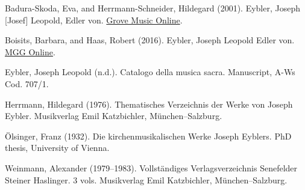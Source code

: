 \documentclass{ees}
\begin{document}
\begin{bulletlist}
  \item Badura-Skoda, Eva, and Herrmann-Schneider, Hildegard (2001). Eybler, Joseph [Josef] Leopold, Edler von. \href{https://doi.org/10.1093/gmo/9781561592630.article.40047}{Grove Music Online}.
  \item Boisits, Barbara, and Haas, Robert (2016). Eybler, Joseph Leopold Edler von. \href{https://www.mgg-online.com/mgg/stable/13179}{MGG Online}.
  \item Eybler, Joseph Leopold (n.d.). Catalogo della musica sacra. Manuscript, A-Ws Cod. 707/1.
  \item Herrmann, Hildegard (1976). Thematisches Verzeichnis der Werke von Joseph Eybler. Musikverlag Emil Katzbichler, München–Salzburg.
  \item Ölsinger, Franz (1932). Die kirchenmusikalischen Werke Joseph Eyblers. PhD thesis, University of Vienna.
  \item Weinmann, Alexander (1979–1983). Vollständiges Verlagsverzeichnis Senefelder Steiner Haslinger. 3 vols. Musikverlag Emil Katzbichler, München–Salzburg.
\end{bulletlist}
\end{document}

